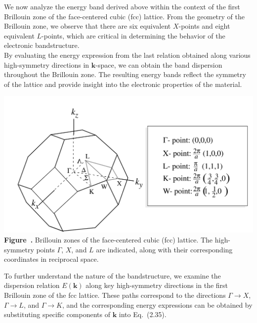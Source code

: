 We now analyze the energy band derived above within the context of the first Brillouin zone of the face-centered cubic (fcc) lattice.
From the geometry of the Brillouin zone, we observe that there are six equivalent \( X \)-points and eight equivalent \( L \)-points, which are critical in determining the behavior of the electronic bandstructure.\\
By evaluating the energy expression from the last relation obtained along various high-symmetry directions in \( \mathbf{k} \)-space, we can obtain the band dispersion throughout the Brillouin zone. The resulting energy bands reflect the symmetry of the lattice and provide insight into the electronic properties of the material.
\begin{center}
	\begin{minipage}{0.9\textwidth}
		\centering
		\includegraphics[width=\textwidth]{img/BrillouinZones.png}
		\\[0.5em]
		\textbf{Figure~\thefigure.} Brillouin zones of the face-centered cubic (fcc) lattice. The high-symmetry points \( \Gamma \), \( X \), and \( L \) are indicated, along with their corresponding coordinates in reciprocal space.
		\label{fig:BrillouinZones}
	\end{minipage}
\end{center}

To further understand the nature of the bandstructure, we examine the dispersion relation \( E(\mathbf{k}) \) along key high-symmetry directions in the first Brillouin zone of the fcc lattice. These paths correspond to the directions \( \Gamma \rightarrow X \), \( \Gamma \rightarrow L \), and \( \Gamma \rightarrow K \), and the corresponding energy expressions can be obtained by substituting specific components of \( \mathbf{k} \) into Eq.~(2.35).

